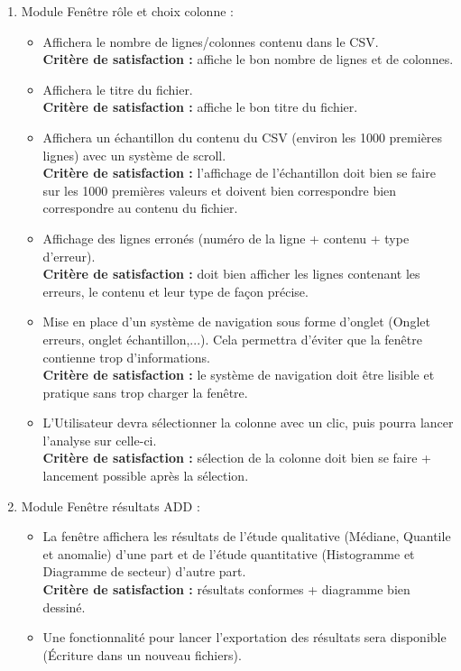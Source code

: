 \begin{description}[style=unboxed,leftmargin=0.2cm]
\begin{enumerate}
					\item Module Fenêtre rôle et choix colonne :
						\begin{itemize}
						\item Affichera le nombre de lignes/colonnes contenu dans le CSV.\\
							\textbf{Critère de satisfaction : } affiche le bon nombre de lignes et de colonnes.
						\item Affichera le titre du fichier.\\
							\textbf{Critère de satisfaction : } affiche le bon titre du fichier.
						\item Affichera un échantillon du contenu du CSV (environ les 1000 premières lignes) avec un système de scroll.\\ 
							\textbf{Critère de satisfaction : } l'affichage de l'échantillon doit bien se faire sur les 1000 premières valeurs et doivent bien correspondre bien correspondre au contenu du fichier. 
						\item Affichage des lignes erronés (numéro de la ligne + contenu + type d'erreur).\\
							\textbf{Critère de satisfaction : } doit bien afficher les lignes contenant les erreurs, le contenu et leur type de façon précise.
						\item Mise en place d'un système de navigation sous forme d'onglet (Onglet erreurs, onglet échantillon,...). Cela permettra d'éviter que la fenêtre contienne trop d'informations.\\
							\textbf{Critère de satisfaction : } le système de navigation doit être lisible et pratique sans trop charger la fenêtre.
						\item L'Utilisateur devra sélectionner la colonne avec un clic, puis pourra lancer l'analyse sur celle-ci. \\
							\textbf{Critère de satisfaction : } sélection de la colonne doit bien se faire + lancement possible après la sélection.
						\end{itemize}
					
					\item Module Fenêtre résultats ADD :
						\begin{itemize}
						\item La fenêtre affichera les résultats de l'étude qualitative (Médiane, Quantile et anomalie) d'une part et de l'étude quantitative (Histogramme et Diagramme de secteur) d'autre part.\\
						\textbf{Critère de satisfaction : } résultats conformes + diagramme bien dessiné. 
						\item Une fonctionnalité pour lancer l'exportation des résultats sera disponible (Écriture dans un nouveau fichiers).
						\end{itemize}
					\end{enumerate}
				
			\end{description}
			
